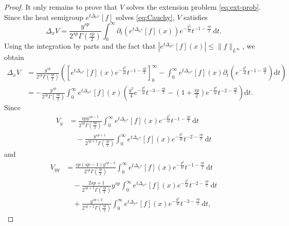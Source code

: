 \documentclass[11pt]{amsart}
\theoremstyle{plain}
\theoremstyle{definition}
\numberwithin{equation}{section}
\begin{document}
\begin{proof}
It only remains to prove that $V$ solves the extension problem \eqref{eq:ext-prob}. Since the heat semigroup $e^{t\Delta_{\mathbb{H}^{n}}}[f]$ solves \eqref{eq:Cauchy}, $V$ satisfies
\begin{equation*}
\Delta_{x} V = \frac{y^{sp}}{2^{sp} \Gamma(\frac{sp}{2})} \int_{0}^{\infty} \partial_{t} \left( e^{t\Delta_{\mathbb{H}^{n}}}[f](x) \right) e^{-\frac{y^2}{4t}} t^{-1-\frac{sp}{2}} \,\mathrm{d}t.
\end{equation*}
Using the integration by parts and the fact that $|e^{t\Delta_{\mathbb{H}^{n}}}[f](x)| \leq \|f\|_{L^{\infty}}$, we obtain
\begin{equation*}
\begin{split}
\Delta_{x} V
&= \frac{y^{sp}}{2^{sp} \Gamma(\frac{sp}{2})} \left( \left[ e^{t\Delta_{\mathbb{H}^{n}}}[f](x) e^{-\frac{y^{2}}{4t}}t^{-1-\frac{sp}{2}} \right]_{0}^{\infty} - \int_{0}^{\infty} e^{t\Delta_{\mathbb{H}^{n}}}[f](x) \partial_{t} \left( e^{-\frac{y^{2}}{4t}} t^{-1-\frac{sp}{2}} \right) \mathrm{d}t \right) \\
&= - \frac{y^{sp}}{2^{sp} \Gamma(\frac{sp}{2})} \int_{0}^{\infty} e^{t\Delta_{\mathbb{H}^{n}}}[f](x) \left(\frac{y^{2}}{4} e^{-\frac{y^{2}}{4t}} t^{-3-\frac{sp}{2}} - \left(1+\frac{sp}{2} \right) e^{-\frac{y^{2}}{4t}} t^{-2-\frac{sp}{2}} \right) \mathrm{d}t.
\end{split}
\end{equation*}
Since
\begin{equation*}
\begin{split}
V_{y}
&= \frac{sp y^{sp-1}}{2^{sp} \Gamma(\frac{sp}{2})} \int_{0}^{\infty} e^{t\Delta_{\mathbb{H}^{n}}}[f](x) e^{-\frac{y^{2}}{4t}} t^{-1-\frac{sp}{2}} \,\mathrm{d}t \\
&\quad - \frac{y^{sp+1}}{2^{sp+1} \Gamma(\frac{sp}{2})} \int_{0}^{\infty} e^{t\Delta_{\mathbb{H}^{n}}}[f](x) e^{-\frac{y^{2}}{4t}} t^{-2-\frac{sp}{2}} \,\mathrm{d}t
\end{split}
\end{equation*}
and
\begin{equation*}
\begin{split}
V_{yy}
&= \frac{sp(sp-1) y^{sp-2}}{2^{sp} \Gamma(\frac{sp}{2})} \int_{0}^{\infty} e^{t\Delta_{\mathbb{H}^{n}}}[f](x) e^{-\frac{y^{2}}{4t}} t^{-1-\frac{sp}{2}} \,\mathrm{d}t \\
&\quad - \frac{2sp+1}{2^{sp+1}\Gamma(\frac{sp}{2})} y^{sp} \int_{0}^{\infty} e^{t\Delta_{\mathbb{H}^{n}}}[f](x) e^{-\frac{y^{2}}{4t}} t^{-2-\frac{sp}{2}} \,\mathrm{d}t \\
&\quad + \frac{y^{sp+2}}{2^{sp+2}\Gamma(\frac{sp}{2})} \int_{0}^{\infty} e^{t\Delta_{\mathbb{H}^{n}}}[f](x) e^{-\frac{y^{2}}{4t}} t^{-3-\frac{sp}{2}} \,\mathrm{d}t,

\end{split}
\end{equation*}
\end{proof}
\end{document}
